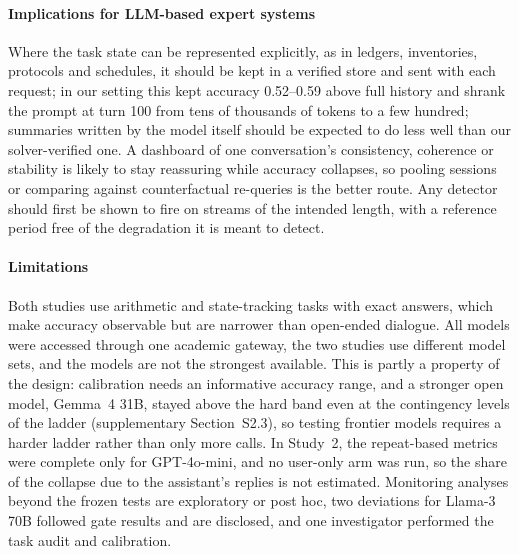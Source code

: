 \paragraph{Implications for LLM-based expert systems}
Where the task state can be represented explicitly, as in ledgers,
inventories, protocols and schedules, it should be kept in a verified store and
sent with each request; in our setting this kept accuracy 0.52--0.59 above full
history and shrank the prompt at turn 100 from tens of thousands of tokens to a
few hundred; summaries written by the model itself should be expected to do
less well than our solver-verified one. A dashboard of one conversation's
consistency, coherence or stability is likely to stay reassuring while accuracy
collapses, so pooling sessions or comparing against counterfactual re-queries
is the better route. Any detector should first be shown to fire on streams of
the intended length, with a reference period free of the degradation it is
meant to detect.

\paragraph{Limitations}
Both studies use arithmetic and state-tracking tasks with exact answers, which
make accuracy observable but are narrower than open-ended dialogue. All models
were accessed through one academic gateway, the two studies use different
model sets, and the models are not the strongest available. This is partly a
property of the design: calibration needs an informative accuracy range, and
a stronger open model, Gemma~4 31B, stayed above the hard band even at the
contingency levels of the ladder (supplementary
Section~S2.3), so testing frontier models requires a
harder ladder rather than only more calls. In Study~2, the repeat-based
metrics were complete only for GPT-4o-mini, and no user-only arm was run, so
the share of the collapse due to the assistant's replies is not estimated.
Monitoring analyses beyond the frozen tests are exploratory or post hoc, two
deviations for Llama-3 70B followed gate results and are disclosed, and one
investigator performed the task audit and calibration.
